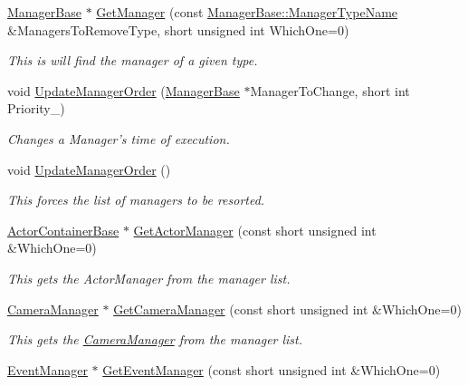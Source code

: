 \begin{DoxyCompactItemize}
\hyperlink{classphys_1_1ManagerBase}{ManagerBase} $\ast$ \hyperlink{classphys_1_1World_a910befc904c0d0e73b913dedd08e9d98}{GetManager} (const \hyperlink{classphys_1_1ManagerBase_aaa6ccddf23892eaccb898529414f80a5}{ManagerBase::ManagerTypeName} \&ManagersToRemoveType, short unsigned int WhichOne=0)
\begin{DoxyCompactList}\small\item\em This is will find the manager of a given type. \item\end{DoxyCompactList}\item 
void \hyperlink{classphys_1_1World_abbe8ceecc6bdbd542a250fd721c05276}{UpdateManagerOrder} (\hyperlink{classphys_1_1ManagerBase}{ManagerBase} $\ast$ManagerToChange, short int Priority\_\-)
\begin{DoxyCompactList}\small\item\em Changes a Manager's time of execution. \item\end{DoxyCompactList}\item 
void \hyperlink{classphys_1_1World_ae807112b9494a94a6ff0d60df0a4d424}{UpdateManagerOrder} ()
\begin{DoxyCompactList}\small\item\em This forces the list of managers to be resorted. \item\end{DoxyCompactList}\item 
\hyperlink{classphys_1_1ActorContainerBase}{ActorContainerBase} $\ast$ \hyperlink{classphys_1_1World_a8173d8959802e923f4972822435e43b6}{GetActorManager} (const short unsigned int \&WhichOne=0)
\begin{DoxyCompactList}\small\item\em This gets the ActorManager from the manager list. \item\end{DoxyCompactList}\item 
\hyperlink{classphys_1_1CameraManager}{CameraManager} $\ast$ \hyperlink{classphys_1_1World_a33ab68866da54b7f8f766d5d29171fb7}{GetCameraManager} (const short unsigned int \&WhichOne=0)
\begin{DoxyCompactList}\small\item\em This gets the \hyperlink{classphys_1_1CameraManager}{CameraManager} from the manager list. \item\end{DoxyCompactList}\item 
\hyperlink{classphys_1_1EventManager}{EventManager} $\ast$ \hyperlink{classphys_1_1World_ac20a304413b4d47f9ae657983e903a67}{GetEventManager} (const short unsigned int \&WhichOne=0)

\end{DoxyCompactItemize}
